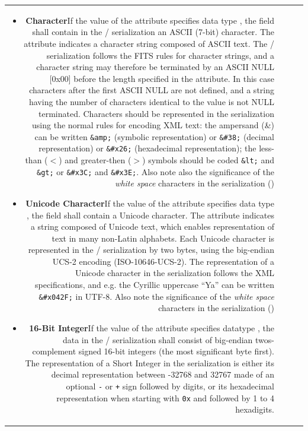 \begin{tabular}{RRCp{0.8\textwidth}}
\begin{center}
{\begin{itemize}
\item {\bf Character}\quad If the value of the {}
attribute specifies data type {},
the field shall contain in the / serialization an ASCII 
(7-bit) character. 
The  attribute
indicates a character string composed of ASCII text. 
The / serialization follows the 
FITS rules for character strings,
and a character string may therefore be terminated by an ASCII 
NULL [0x00]
before the length specified in the  attribute.
In this case characters after the first ASCII NULL are not defined,
and a string having the number of characters identical to
the  value is not NULL terminated. 
Characters should be represented in the  serialization
using the normal rules for encoding XML text: 
the ampersand (\&) can be written \verb+&amp;+ (symbolic representation)
or \verb+&#38;+ (decimal representation) or 
\verb+&#x26;+ (hexadecimal representation); the less-than ($<$) and greater-then ($>$) symbols should be coded \verb+&lt;+ and \verb+&gt;+ 
or \verb+&#x3C;+ and \verb+&#x3E;+.
Also note also the significance of the {\em white space} characters
in the  serialization
()

\item {\bf Unicode Character}\quad If the value of the {}
attribute specifies data type {},
the field shall contain a Unicode character.
The  attribute
indicates a string composed of Unicode text,
which enables representation of text in many non-Latin alphabets.
Each Unicode character is represented in the / serialization by 
two bytes, using the big-endian UCS-2 encoding (ISO-10646-UCS-2).
The representation of a Unicode character in the   serialization
follows the XML specifications, 
and e.g. the Cyrillic uppercase ``Ya'' can be written 
\verb+&#x042F;+ in UTF-8.
Also note the significance of the {\em white space} characters
in the  serialization
()


\item {\bf 16-Bit Integer}\quad If the value of the {}
attribute specifies datatype {}, 
the data in the / serialization shall consist of
big-endian twos-complement signed 16-bit integers 
(the most significant byte first). 
The representation of a Short Integer in the  serialization
is either its decimal representation between -32768 and 32767
   made of an optional {\tt-} or {\tt+} sign followed by digits,
   or its hexadecimal representation when starting with {\tt0x}
   and followed by 1 to 4 hexadigits.


\end{itemize}}
\end{center}
\end{tabular}
